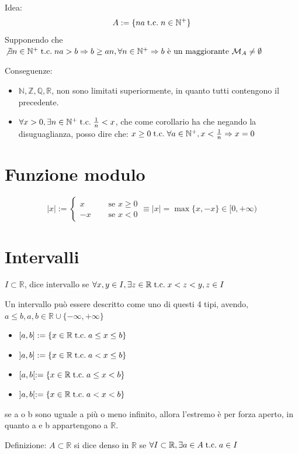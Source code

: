 \documentclass[a4paper, 12pt, openany]{book}
\begin{document}
	Idea:
	\[A :=  \{na \;\text{t.c.}\; n \in \mathbb{N}^+\}\]
	Supponendo che $\not \exists n \in \mathbb{N}^+ \;\text{t.c.}\; na > b \Rightarrow b \geq an, \forall n \in \mathbb{N}^+ \Rightarrow b \text{ è un maggiorante } \mathcal{M}_A \not = \emptyset $ %
	
	Conseguenze:
	\begin{itemize}
		\item $\mathbb{N}, \mathbb{Z}, \mathbb{Q}, \mathbb{R}$, non sono limitati superiormente, in quanto tutti contengono il precedente.
		\item $\forall x > 0, \exists n \in \mathbb{N}^+ \;\text{t.c.}\; \frac{1}{n} < x$, che come corollario ha che negando la disuguaglianza, posso dire che:
		$x \geq 0 \;\text{t.c.}\; \forall a \in \mathbb{N}^+, x < \frac{1}{n} \Rightarrow x = 0$
	\end{itemize}
	
	\section{Funzione modulo}
	\[|x| := 
	\left\{
	\begin{aligned}
		x & \quad \text{ se } x \geq 0\\
		-x & \quad \text{ se } x < 0
	\end{aligned}
	\right. \equiv |x| = \max\{x, -x\} \in [0, +\infty)
	\]
	
	\section{Intervalli}
	$I \subset \mathbb{R}$, dice intervallo se $\forall x,y \in I, \exists z \in \mathbb{R} \;\text{t.c.}\; x < z < y, z \in I$
	
	Un intervallo può essere descritto come uno di questi 4 tipi, avendo, $a \leq b, a,b \in \mathbb{R} \cup \{-\infty, +\infty\}$
	\begin{itemize}
		\item $[a, b] := \{x \in \mathbb{R} \;\text{t.c.}\; a \leq x \leq b\}$
		\item $]a, b] := \{x \in \mathbb{R} \;\text{t.c.}\; a < x \leq b\}$
		\item $[a, b[ := \{x \in \mathbb{R} \;\text{t.c.}\; a \leq x < b\}$
		\item $]a, b[ := \{x \in \mathbb{R} \;\text{t.c.}\; a < x < b\}$
	\end{itemize}
	se a o b sono uguale a più o meno infinito, allora l'estremo è per forza aperto, in quanto a e b appartengono a $\mathbb{R}$.
	
	Definizione:
	$A \subset \mathbb{R}$ si dice denso in $\mathbb{R}$ se $\forall I \subset \mathbb{R}, \exists a \in A \;\text{t.c.}\; a \in I$
	
\end{document}
